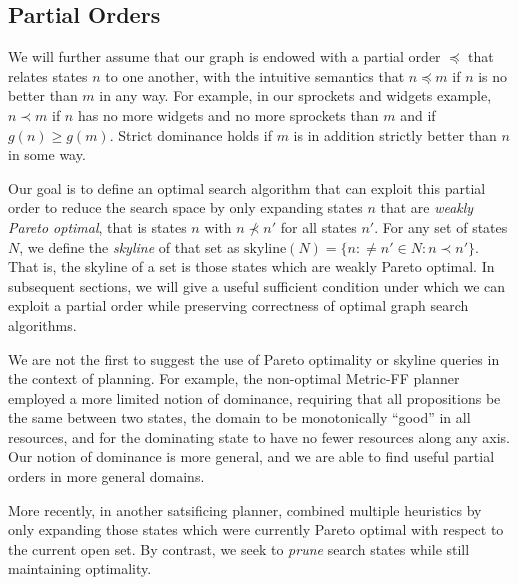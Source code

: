 \documentclass[letterpaper]{article}
\theoremstyle{plain} \newtheorem{theorem}{Theorem} \newtheorem{proposition}{Proposition} \newtheorem{lemma}{Lemma}
\theoremstyle{definition} \newtheorem{definition}{Definition} \newtheorem{conjecture}{Conjecture} \newtheorem*{example}{Example}
\theoremstyle{remark} \newtheorem*{remark}{Remark} \newtheorem*{note}{Note} \newtheorem{case}{Case}
\begin{document}
\subsection{Partial Orders}

We will further assume that our graph is endowed with a partial order $\preceq$
that relates states $n$ to one another, with the intuitive semantics that
$n \preceq m$ if $n$ is no better than $m$ in any way. For example, in
our sprockets and widgets example, $n \prec m$ if $n$ has no more widgets and
no more sprockets than $m$ and if $g(n) \ge g(m)$. Strict dominance
holds if $m$ is in addition strictly better than $n$ in some way.

Our goal is to define an optimal search algorithm that can exploit
this partial order to reduce the search space by only expanding
states $n$ that are \textit{weakly Pareto optimal}, that is states
$n$ with $n \nprec n'$ for all states $n'$. For any set of states
$N$, we define the \textit{skyline} of that set as
$\textrm{skyline}(N)=\{n: \ne n' \in N: n \prec n'\}$. That is, the
skyline of a set is those states which are weakly Pareto optimal.
In subsequent sections, we will give a useful sufficient condition
under which we can exploit a partial order while preserving correctness
of optimal graph search algorithms.

We are not the first to suggest the use of Pareto optimality or
skyline queries in the context of planning. For example, the
non-optimal Metric-FF planner~\cite{hoffmann2003metric} employed a
more limited notion of dominance, requiring that all propositions
be the same between two states, the domain to be monotonically
``good'' in all resources, and for the dominating state to have no
fewer resources along any axis. Our notion of dominance is more
general, and we are able to find useful partial orders in more general
domains.

More recently, in another satsificing planner, \citet{roger2010more}
combined multiple heuristics by only expanding those states which
were currently Pareto optimal with respect to the current open set.
By contrast, we seek to \textit{prune} search states while still
maintaining optimality.
\end{document}

